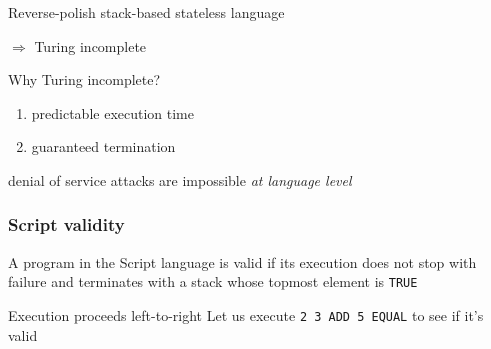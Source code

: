 \documentclass[11pt]{beamer}  %
\begin{document}
\begin{frame}
\begin{greenbox}{Reverse-polish stack-based stateless language}
    \begin{center}
      \alert{$\Rightarrow$ Turing incomplete}
    \end{center}

  \end{greenbox}

  \bigskip

  \begin{greenbox}{Why Turing incomplete?}
    \begin{enumerate}
    \item predictable execution time
    \item guaranteed termination
    \end{enumerate}

    \begin{center}
      denial of service attacks are impossible \emph{at language level}
    \end{center}

  \end{greenbox}

\end{frame}

\begin{frame}\frametitle{Script validity}

  \begin{greenbox}{}
    A program in the Script language is \alert{valid} if its execution
    does not stop with failure and terminates with a stack whose topmost element is \texttt{TRUE}
  \end{greenbox}

  \bigskip

  \begin{greenbox}{Execution proceeds left-to-right}
    Let us execute \texttt{2 3 ADD 5 EQUAL} to see if it's valid
  \end{greenbox}

\end{frame}
\end{document}
